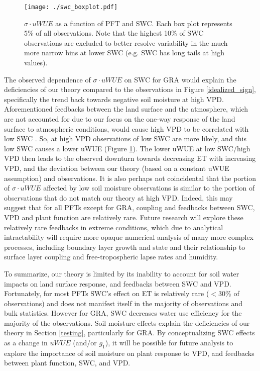 \begin{figure}
  \centering
  \centerline{\texttt{[image: ./swc\_boxplot.pdf]}}
  \caption{$\sigma \cdot uWUE$ as a function of PFT and SWC. Each box
    plot represents 5\% of all observations. Note that the highest
    10\% of SWC observations are excluded to better resolve variability in the much more narrow bins at lower SWC (e.g. SWC has long tails at high values).}
  \label{swc_boxplot}
\end{figure}

The observed dependence of $\sigma \cdot uWUE$ on SWC for GRA would
explain the deficiencies of our theory compared to the observations in
Figure \ref{idealized_sign}, specifically the trend back towards
negative soil moisture at high VPD. Aforementioned feedbacks between
the land surface and the atmosphere, which are not accounted for due
to our focus on the one-way response of the land surface to
atmospheric conditions, would cause high VPD to be correlated with low
SWC \citep[][]{Gentine_2016, Berg_2016}. So, at high VPD observations
of low SWC are more likely, and this low SWC causes a lower uWUE
(Figure \ref{swc_boxplot}). The lower uWUE at low SWC/high VPD then
leads to the observed downturn towards decreasing ET with increasing
VPD, and the deviation between our theory (based on a constant uWUE
assumption) and observations. It is also perhaps not coincidental that
the portion of $\sigma \cdot uWUE$ affected by low soil moisture
observations is similar to the portion of observations that do not
match our theory at high VPD. Indeed, this may suggest that for all PFTs
except for GRA, coupling and feedbacks between SWC, VPD and plant
function are relatively rare. Future research will explore these relatively rare feedbacks in extreme conditions, which due to analytical intractability will require more opaque numerical analysis of many more complex processes, including boundary layer growth and state and their relationship to surface layer coupling and free-tropospheric lapse rates and humidity.

To summarize, our theory is limited by its inability to account for
soil water impacts on land surface response, and feedbacks between SWC
and VPD. Fortunately, for most PFTs SWC's effect on ET is relatively
rare ($<$30\% of observations) and does not manifest itself in the
majority of observations and bulk statistics. However for GRA, SWC decreases water use efficiency for the majority of
the observations. Soil moisture effects explain the deficiencies of
our theory in Section \ref{testing}, particularly for GRA. By
conceptualizing SWC effects as a change in $uWUE$ (and/or $g_1$), it
will be possible for future analysis to explore the importance of soil
moisture on plant response to VPD, and feedbacks between plant
function, SWC, and VPD.

